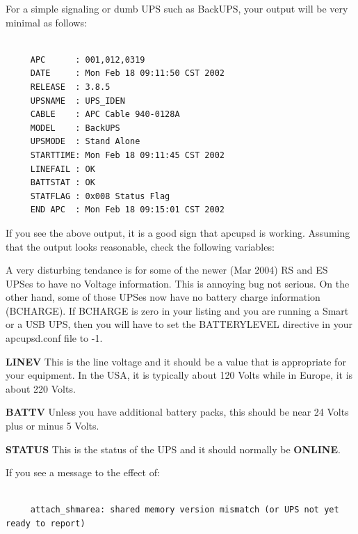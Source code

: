 For a simple signaling or dumb UPS such as BackUPS, your output will be very
minimal as follows: 

\footnotesize
\begin{verbatim}
     
     APC      : 001,012,0319
     DATE     : Mon Feb 18 09:11:50 CST 2002
     RELEASE  : 3.8.5
     UPSNAME  : UPS_IDEN
     CABLE    : APC Cable 940-0128A
     MODEL    : BackUPS
     UPSMODE  : Stand Alone
     STARTTIME: Mon Feb 18 09:11:45 CST 2002
     LINEFAIL : OK
     BATTSTAT : OK
     STATFLAG : 0x008 Status Flag
     END APC  : Mon Feb 18 09:15:01 CST 2002
\end{verbatim}
\normalsize

If you see the above output, it is a good sign that apcupsd is working.
Assuming that the output looks reasonable, check the following variables:  

A very disturbing tendance is for some of the newer (Mar 2004) RS and ES UPSes
to have no Voltage information.  This is annoying bug not serious.  On the
other hand, some of those UPSes now have no battery charge information
(BCHARGE).  If BCHARGE is zero in your listing and you are running a Smart or
a USB UPS, then you will have to set the BATTERYLEVEL directive in your
apcupsd.conf file to -1.  

\begin{description}

\item {\bf LINEV}
This is the line voltage and it should be a value that is appropriate for your
equipment. In the USA, it is typically about 120 Volts while in Europe, it is
about 220 Volts.  

\item {\bf BATTV}
Unless you have additional battery packs, this should be near 24 Volts plus or
minus 5 Volts.  

\item {\bf STATUS}
This is the status of the UPS and it should normally be {\bf ONLINE}. 
\end{description}

If you see a message to the effect of: 

\footnotesize
\begin{verbatim}
     
     attach_shmarea: shared memory version mismatch (or UPS not yet ready to report)
\end{verbatim}
\normalsize

